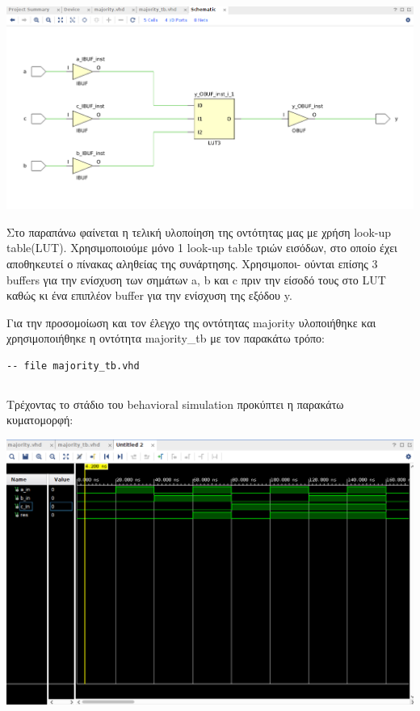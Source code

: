 \documentclass[]{article}
\begin{document}
\begin{center}
	\includegraphics[width=\textwidth]{synthesis_schem.png}
\end{center}

Στο παραπάνω φαίνεται η τελική υλοποίηση της οντότητας μας με χρήση look-up table(LUT). Χρησιμοποιούμε μόνο
1 look-up table τριών εισόδων, στο οποίο έχει αποθηκευτεί ο πίνακας αληθείας της συνάρτησης. Χρησιμοποι-
ούνται επίσης 3 buffers για την ενίσχυση των σημάτων a, b και c πριν την είσοδό τους στο LUT καθώς κι ένα επιπλέον buffer για την ενίσχυση της εξόδου y.

Για την προσομοίωση και τον έλεγχο της οντότητας majority υλοποιήθηκε και χρησιμοποιήθηκε η οντότητα majority\_tb με τον παρακάτω τρόπο:
\begin{verbatim}
-- file majority_tb.vhd
\end{verbatim}
\inputminted{vhdl}{./assign_1/majority_tb.vhdl}

Τρέχοντας το στάδιο του behavioral simulation προκύπτει η παρακάτω κυματομορφή:
\begin{center}
	\includegraphics[width=\textwidth]{behavioral.png}
\end{center}
\end{document}
